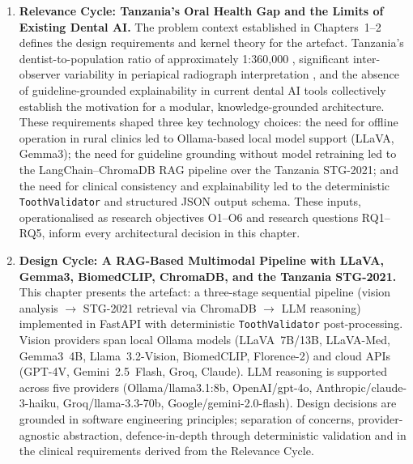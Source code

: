 \documentclass[12pt,a4paper]{report}
\begin{document}
	\begin{enumerate}
		
		\item \textbf{Relevance Cycle: Tanzania's Oral Health Gap and the Limits of
			Existing Dental AI.}
		The problem context established in Chapters~1--2 defines the design
		requirements and kernel theory for the artefact. Tanzania's
		dentist-to-population ratio of approximately 1:360{,}000
		\cite{Edward2024OralHealthTZ}, significant inter-observer variability in
		periapical radiograph interpretation \cite{hintze1998reliability_caries,
			pillai2022interobserver_demirjian, saunders2001radiographic_reliability},
		and the absence of guideline-grounded explainability in current dental AI
		tools \cite{schwendicke2022ai_global, putra2021ai_dental_radiography,
			holzinger2017explainableai} collectively establish the motivation for a
		modular, knowledge-grounded architecture. These requirements shaped three
		key technology choices: the need for offline operation in rural clinics
		led to Ollama-based local model support (LLaVA, Gemma3); the need for
		guideline grounding without model retraining led to the LangChain--ChromaDB
		RAG pipeline over the Tanzania STG-2021; and the need for clinical
		consistency and explainability led to the deterministic
		\texttt{ToothValidator} and structured JSON output schema. These
		inputs, operationalised as research objectives O1--O6 and research
		questions RQ1--RQ5, inform every architectural decision in this chapter.
		
		\item \textbf{Design Cycle: A RAG-Based Multimodal Pipeline with LLaVA,
			Gemma3, BiomedCLIP, ChromaDB, and the Tanzania STG-2021.}
		This chapter presents the artefact: a three-stage sequential pipeline
		(vision analysis $\rightarrow$ STG-2021 retrieval via ChromaDB
		$\rightarrow$ LLM reasoning) implemented in FastAPI with deterministic
		\texttt{ToothValidator} post-processing. Vision providers span local Ollama
		models (LLaVA~7B/13B, LLaVA-Med, Gemma3~4B, Llama~3.2-Vision,
		BiomedCLIP, Florence-2) and cloud APIs (GPT-4V, Gemini~2.5~Flash,
		Groq, Claude). LLM reasoning is supported across five providers
		(Ollama/llama3.1:8b, OpenAI/gpt-4o, Anthropic/claude-3-haiku,
		Groq/llama-3.3-70b, Google/gemini-2.0-flash). Design decisions are
		grounded in software engineering principles; separation of concerns,
		provider-agnostic abstraction, defence-in-depth through deterministic
		validation and in the clinical requirements derived from the Relevance
		Cycle.
		

\end{enumerate}
\end{document}

